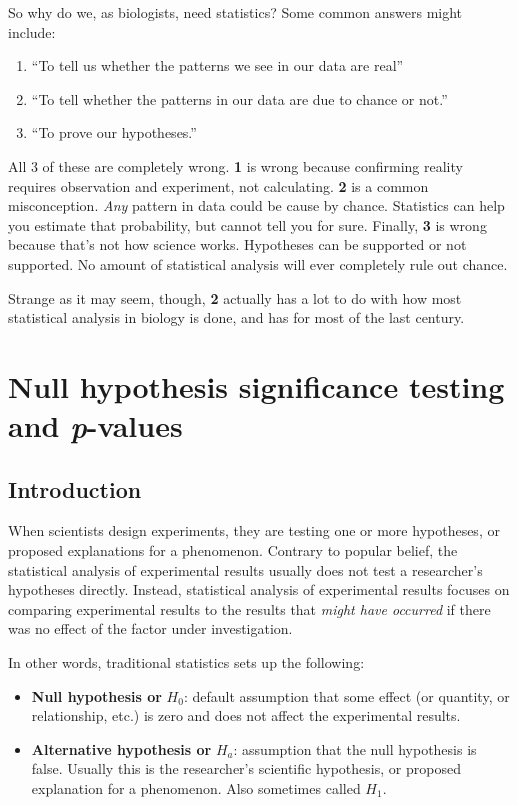 \documentclass[
  13,
  letterpaper,
]{report}
\begin{document}
So why do we, as biologists, need statistics? Some common answers might
include:

\begin{enumerate}
\def\labelenumi{\arabic{enumi}.}
\item
  ``To tell us whether the patterns we see in our data are real''
\item
  ``To tell whether the patterns in our data are due to chance or not.''
\item
  ``To prove our hypotheses.''
\end{enumerate}

All 3 of these are completely wrong. \textbf{1} is wrong because
confirming reality requires observation and experiment, not calculating.
\textbf{2} is a common misconception. \emph{Any} pattern in data could
be cause by chance. Statistics can help you estimate that probability,
but cannot tell you for sure. Finally, \textbf{3} is wrong because
that's not how science works. Hypotheses can be supported or not
supported. No amount of statistical analysis will ever completely rule
out chance.

Strange as it may seem, though, \textbf{2} actually has a lot to do with
how most statistical analysis in biology is done, and has for most of
the last century.

\section{\texorpdfstring{Null hypothesis significance testing and
\emph{p}-values}{Null hypothesis significance testing and p-values}}\label{sec-intro-nhst}

\subsection{Introduction}\label{sec-intro-nhst-intro}

When scientists design experiments, they are testing one or more
hypotheses, or proposed explanations for a phenomenon. Contrary to
popular belief, the statistical analysis of experimental results usually
does not test a researcher's hypotheses directly. Instead, statistical
analysis of experimental results focuses on comparing experimental
results to the results that \emph{might have occurred} if there was no
effect of the factor under investigation.

In other words, traditional statistics sets up the following:

\begin{itemize}
\item
  \textbf{Null hypothesis or} \(H_0\): default assumption that some
  effect (or quantity, or relationship, etc.) is zero and does not
  affect the experimental results.
\item
  \textbf{Alternative hypothesis or} \(H_a\): assumption that the null
  hypothesis is false. Usually this is the researcher's scientific
  hypothesis, or proposed explanation for a phenomenon. Also sometimes
  called \(H_1\).
\end{itemize}
\end{document}
